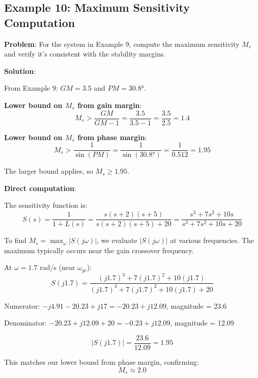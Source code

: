 \subsection{Example 10: Maximum Sensitivity Computation}

\textbf{Problem}: For the system in Example 9, compute the maximum sensitivity $M_s$ and verify it's consistent with the stability margins.

\textbf{Solution}:

From Example 9: $GM = 3.5$ and $PM = 30.8°$.

\textbf{Lower bound on $M_s$ from gain margin}:
\begin{equation}
    M_s > \frac{GM}{GM - 1} = \frac{3.5}{3.5 - 1} = \frac{3.5}{2.5} = 1.4
\end{equation}

\textbf{Lower bound on $M_s$ from phase margin}:
\begin{equation}
    M_s > \frac{1}{\sin(PM)} = \frac{1}{\sin(30.8°)} = \frac{1}{0.512} = 1.95
\end{equation}

The larger bound applies, so $M_s \geq 1.95$.

\textbf{Direct computation}:

The sensitivity function is:
\begin{equation}
    S(s) = \frac{1}{1 + L(s)} = \frac{s(s+2)(s+5)}{s(s+2)(s+5) + 20} = \frac{s^3 + 7s^2 + 10s}{s^3 + 7s^2 + 10s + 20}
\end{equation}

To find $M_s = \max_\omega |S(j\omega)|$, we evaluate $|S(j\omega)|$ at various frequencies. The maximum typically occurs near the gain crossover frequency.

At $\omega = 1.7$ rad/s (near $\omega_{gc}$):
\begin{equation}
    S(j1.7) = \frac{(j1.7)^3 + 7(j1.7)^2 + 10(j1.7)}{(j1.7)^3 + 7(j1.7)^2 + 10(j1.7) + 20}
\end{equation}

Numerator: $-j4.91 - 20.23 + j17 = -20.23 + j12.09$, magnitude = 23.6

Denominator: $-20.23 + j12.09 + 20 = -0.23 + j12.09$, magnitude = 12.09

\begin{equation}
    |S(j1.7)| = \frac{23.6}{12.09} = 1.95
\end{equation}

This matches our lower bound from phase margin, confirming:
\begin{equation}
    \boxed{M_s \approx 2.0}
\end{equation}

